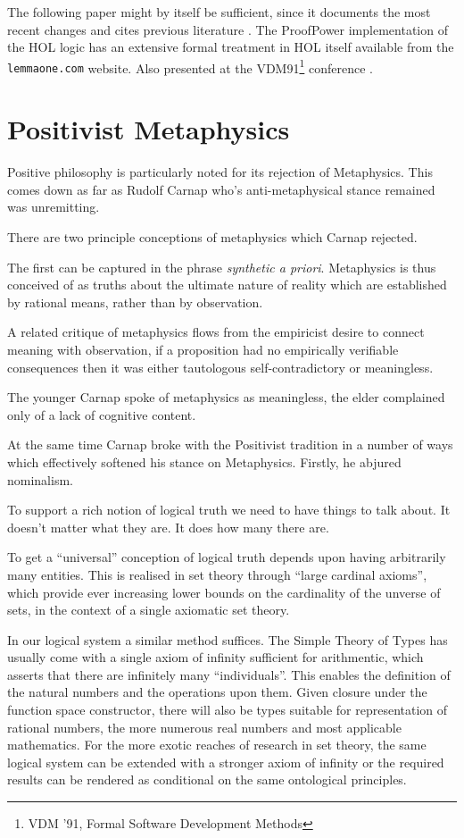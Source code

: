 \documentclass[10pt,titlepage]{book}
\begin{document}
  The following paper might by itself be sufficient, since it documents the most recent changes and cites previous literature \cite{arthan2016}.
  The ProofPower implementation of the HOL logic has an extensive formal treatment in HOL itself 
  \cite{arthanspc001,arthanspc002,arthanspc003,arthanspc004,arthanspc005} available from the {\tt lemmaone.com} website.
  Also presented at the VDM91\footnote{VDM ’91, Formal Software Development Methods} conference \cite{arthan91}.
  
\section{Positivist Metaphysics}

Positive philosophy is particularly noted for its rejection of Metaphysics.
This comes down as far as Rudolf Carnap who's anti-metaphysical stance remained was unremitting.

There are two principle conceptions of metaphysics which Carnap rejected.

The first can be captured in the phrase \emph{synthetic a priori}.
Metaphysics is thus conceived of as truths about the ultimate nature of reality which are established by rational means, rather than by observation.

A related critique of metaphysics flows from the empiricist desire to connect meaning with observation, if a proposition had no empirically verifiable consequences then it was either tautologous self-contradictory or meaningless.

The younger Carnap spoke of metaphysics as meaningless, the elder complained only of a lack of cognitive content.

At the same time Carnap broke with the Positivist tradition in a number of ways which effectively softened his stance on Metaphysics.
Firstly, he abjured nominalism.

To support a rich notion of logical truth we need to have things to talk about.
It doesn't matter what they are.
It does how many there are.

To get a ``universal'' conception of logical truth depends upon having arbitrarily many entities.
This is realised in set theory through ``large cardinal axioms'', which provide ever increasing lower bounds on the cardinality of the unverse of sets, in the context of a single axiomatic set theory.

In our logical system a similar method suffices.
The Simple Theory of Types has usually come with a single axiom of infinity sufficient for arithmentic, which asserts that there are infinitely many ``individuals''.
This enables the definition of the natural numbers and the operations upon them.
Given closure under the function space constructor, there will also be types suitable for representation of rational numbers, the more numerous real numbers and most applicable mathematics.
For the more exotic reaches of research in set theory, the same logical system can be extended with a stronger axiom of infinity or the required results can be rendered as conditional on the same ontological principles. 
\end{document}
